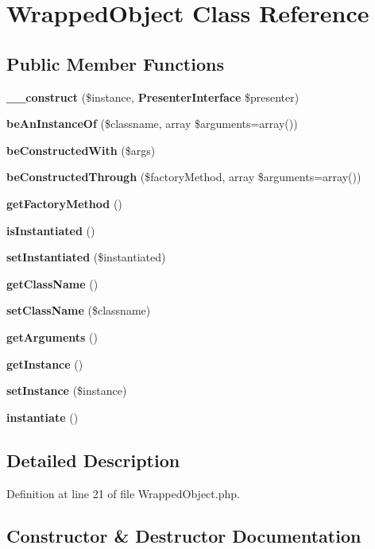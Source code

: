 \section{Wrapped\+Object Class Reference}
\label{class_php_spec_1_1_wrapper_1_1_subject_1_1_wrapped_object}
\subsection*{Public Member Functions}
\begin{DoxyCompactItemize}
\item 
{\bf \+\_\+\+\_\+construct} (\$instance, {\bf Presenter\+Interface} \$presenter)
\item 
{\bf be\+An\+Instance\+Of} (\$classname, array \$arguments=array())
\item 
{\bf be\+Constructed\+With} (\$args)
\item 
{\bf be\+Constructed\+Through} (\$factory\+Method, array \$arguments=array())
\item 
{\bf get\+Factory\+Method} ()
\item 
{\bf is\+Instantiated} ()
\item 
{\bf set\+Instantiated} (\$instantiated)
\item 
{\bf get\+Class\+Name} ()
\item 
{\bf set\+Class\+Name} (\$classname)
\item 
{\bf get\+Arguments} ()
\item 
{\bf get\+Instance} ()
\item 
{\bf set\+Instance} (\$instance)
\item 
{\bf instantiate} ()
\end{DoxyCompactItemize}


\subsection{Detailed Description}


Definition at line 21 of file Wrapped\+Object.\+php.



\subsection{Constructor \& Destructor Documentation}
